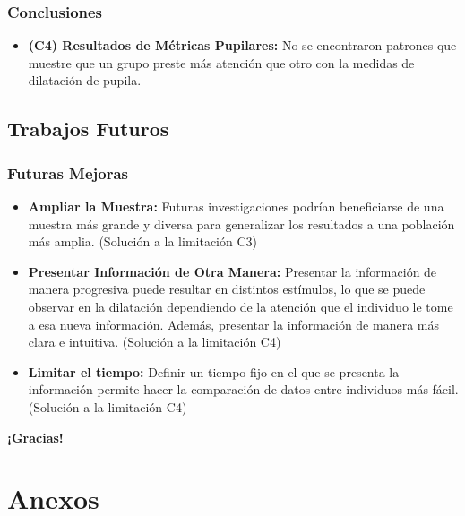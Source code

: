 \documentclass{beamer}
\begin{document}
\begin{frame}
    \frametitle{Conclusiones}
    \begin{itemize}
        
        \item \textbf{(C4) Resultados de Métricas Pupilares:} No se encontraron patrones que muestre que un grupo preste más atención que otro con la medidas de dilatación de pupila.
    \end{itemize}
\end{frame}
\subsection{Trabajos Futuros}
\begin{frame}
    \frametitle{Futuras Mejoras}
    \begin{itemize}
        \item \textbf{Ampliar la Muestra:} Futuras investigaciones podrían beneficiarse de una muestra más grande y diversa para generalizar los resultados a una población más amplia. (Solución a la limitación C3)
        
        \item \textbf{Presentar Información de Otra Manera:} Presentar la información de manera progresiva puede resultar en distintos estímulos, lo que se puede observar en la dilatación dependiendo de la atención que el individuo le tome a esa nueva información. Además, presentar la información de manera más clara e intuitiva. (Solución a la limitación C4) 
        
        \item \textbf{Limitar el tiempo:} Definir un tiempo fijo en el que se presenta la información permite hacer la comparación de datos entre individuos más fácil. (Solución a la limitación C4)
    \end{itemize}
\end{frame}

\begin{frame}
\centering
    \huge \textbf{¡Gracias!}
\end{frame}



\section{Anexos}
\end{document}
